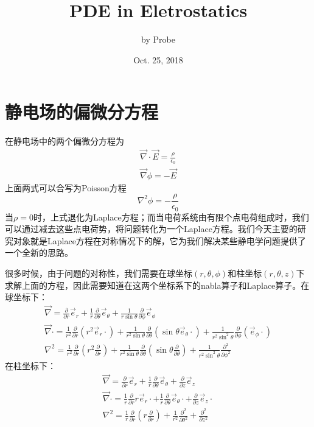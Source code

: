\documentclass[a4paper,10pt]{ctexart}
\title{PDE in Eletrostatics}
\author{by Probe}
\date{Oct. 25, 2018}
\begin{document}
\maketitle

\section{静电场的偏微分方程}

在静电场中的两个偏微分方程为
\begin{gather}
\vec{\nabla} \cdot \vec{E} = \frac{\rho}{\epsilon_0} \\
\vec{\nabla} \phi = - \vec{E}
\end{gather}
上面两式可以合写为Poisson方程
\begin{equation}
\nabla^2 \phi = -\frac{\rho}{\epsilon_0}
\end{equation}
当$\rho=0$时，上式退化为Laplace方程；而当电荷系统由有限个点电荷组成时，我们可以通过减去这些点电荷势，将问题转化为一个Laplace方程。我们今天主要的研究对象就是Laplace方程在对称情况下的解，它为我们解决某些静电学问题提供了一个全新的思路。\par
很多时候，由于问题的对称性，我们需要在球坐标$(r,\theta,\phi)$和柱坐标$(r,\theta,z)$下求解上面的方程，因此需要知道在这两个坐标系下的nabla算子和Laplace算子。在球坐标下：
\begin{gather}
\vec{\nabla} = \frac{\partial}{\partial r} \vec{e}_r + \frac{1}{r} \frac{\partial}{\partial \theta} \vec{e}_\theta + \frac{1}{r\sin \theta} \frac{\partial}{\partial \phi} \vec{e}_\phi \\
\vec{\nabla} \cdot = \frac{1}{r^2} \frac{\partial}{\partial r}(r^2 \vec{e}_r \cdot)  + \frac{1}{r^2 \sin \theta} \frac{\partial}{\partial \theta}( \sin \theta  \vec{e}_\theta \cdot) + \frac{1}{r^2 \sin^2 \theta} \frac{\partial}{\partial \phi}( \vec{e}_\phi \cdot)\\
\nabla^2 = \frac{1}{r^2} \frac{\partial}{\partial r} (r^2 \frac{\partial}{\partial r}) + \frac{1}{r^2 \sin \theta} \frac{\partial}{\partial \theta}(\sin \theta \frac{\partial}{\partial \theta}) + \frac{1}{r^2 \sin^2 \theta} \frac{\partial^2}{\partial \phi^2}
\end{gather}
在柱坐标下：
\begin{gather}
\vec{\nabla} = \frac{\partial}{\partial r} \vec{e}_r + \frac{1}{r} \frac{\partial}{\partial \theta} \vec{e}_\theta + \frac{\partial}{\partial z} \vec{e}_z \\
\vec{\nabla} \cdot = \frac{1}{r} \frac{\partial}{\partial r} r\vec{e}_r\cdot + \frac{1}{r} \frac{\partial}{\partial \theta} \vec{e}_\theta\cdot + \frac{\partial}{\partial z} \vec{e}_z\cdot \\
\nabla^2 = \frac{1}{r} \frac{\partial}{\partial r} (r \frac{\partial}{\partial r}) + \frac{1}{r^2}\frac{\partial^2}{\partial \theta^2} +\frac{\partial^2}{\partial z^2}
\end{gather}
\end{document}
